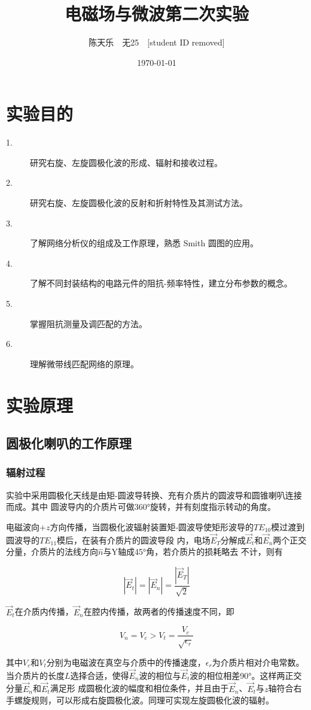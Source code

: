 \documentclass[UTF8]{ctexart}
\title{\textbf{电磁场与微波第二次实验}}
\author{陈天乐\ \ 无25\ \ [student ID removed] }
\date{\today}
\begin{document}
\maketitle
\tableofcontents
\newpage
\section{实验目的}
\begin{description}
    \item[1.] 研究右旋、左旋圆极化波的形成、辐射和接收过程。
    \item[2.] 研究右旋、左旋圆极化波的反射和折射特性及其测试方法。
    \item[3.] 了解网络分析仪的组成及工作原理，熟悉 Smith 圆图的应用。
    \item[4.] 了解不同封装结构的电路元件的阻抗-频率特性，建立分布参数的概念。
    \item[5.] 掌握阻抗测量及调匹配的方法。
    \item[6.]理解微带线匹配网络的原理。
\end{description}

\section{实验原理}
\subsection{圆极化喇叭的工作原理}
\subsubsection{辐射过程}

实验中采用圆极化天线是由矩-圆波导转换、充有介质片的圆波导和圆锥喇叭连接而成。其中
圆波导内的介质片可做360°旋转，并有刻度指示转动的角度。

电磁波向$+z$方向传播，当圆极化波辐射装置矩-圆波导使矩形波导的$TE_{10}$模过渡到圆波导的$TE_{11}$模后，在装有介质片的圆波导段
内，电场$\vec{E}_T$分解成$\vec{E}_t$和$\vec{E}_n$两个正交分量，介质片的法线方向$\hat{n}$与Y轴成45°角，若介质片的损耗略去
不计，则有

$$
\left|\vec{E}_t\right|=\left|\vec{E}_n\right|=\frac{\left|\vec{E}_T\right|}{\sqrt{2}}
$$

$\vec{E}_t$在介质内传播，$\vec{E}_n$在腔内传播，故两者的传播速度不同，即

$$
V_n=V_c>V_t=\frac{V_c}{\sqrt{\epsilon_r}}
$$

其中$V_c$和$V_t$分别为电磁波在真空与介质中的传播速度，$\epsilon_r$为介质片相对介电常数。当介质片的长度$L$选择合适，使得$\vec{E}_n$波的相位与$\vec{E}_t$波的相位相差90°。这样两正交分量$\vec{E}_n$和$\vec{E}_t$满足形
成圆极化波的幅度和相位条件，并且由于$\vec{E}_n$、$\vec{E}_t$与$z$轴符合右手螺旋规则，可以形成右旋圆极化波。同理可实现左旋圆极化波的辐射。
\end{document}

